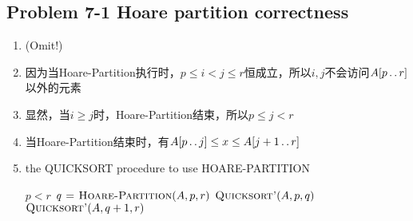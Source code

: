 \subsection*{Problem 7-1 Hoare partition correctness}
\begin{enumerate}
	\item	(Omit!)
	\item	因为当Hoare-Partition执行时，$p \leq i < j \leq r$恒成立，所以$i,j$不会访问$A[p \mathinner{\ldotp\ldotp} r]$以外的元素
	\item	显然，当$i \geq j$时，Hoare-Partition结束，所以$p \leq j < r$
	\item	当Hoare-Partition结束时，有$A[p \mathinner{\ldotp\ldotp} j] \leq x \leq A[j + 1 \mathinner{\ldotp\ldotp} r]$
	\item	the QUICKSORT procedure to use HOARE-PARTITION 
		\begin{codebox}
		\li	\If $p < r$
		\li	\Then
				$\id{q} \gets \proc{Hoare-Partition}(A, p, r)$
		\li		$\textnormal{\scshape Quicksort'}(A, p, q)$
		\li		$\textnormal{\scshape Quicksort'}(A, q + 1, r)$
			\End		
		\end{codebox}
		
\end{enumerate}

